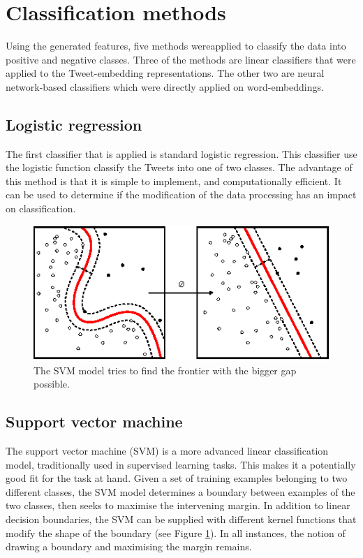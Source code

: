 \section{Classification methods}
\label{sec:methods}
Using the generated features, five methods wereapplied to classify the data into positive and negative classes. Three of the methods are linear classifiers that were applied to the Tweet-embedding representations. The other two are neural network-based classifiers which were directly applied on word-embeddings.

\subsection{Logistic regression}
The first classifier that is applied is standard logistic regression. This classifier use the logistic function classify the Tweets into one of two classes. The advantage of this method is that it is simple to implement, and computationally efficient. It can be used to determine if the modification of the data processing has an impact on classification.

\begin{figure}[h!]
\centering
	\includegraphics[scale=1.2]{SVM} 
\caption{The SVM model tries to find the frontier with the bigger gap possible. \cite{wikiSVM}}
\label{plot:SVM}
\end{figure}
\FloatBarrier

\subsection{Support vector machine}
The support vector machine (SVM) is a more advanced linear classification model, traditionally used in supervised learning tasks. This makes it a potentially good fit for the task at hand. Given a set of training examples belonging to two different classes, the SVM model determines a boundary between examples of the two classes, then seeks to maximise the intervening margin. In addition to linear decision boundaries, the SVM can be supplied with different kernel functions that modify the shape of the boundary (see Figure \ref{plot:SVM}). In all instances, the notion of drawing a boundary and maximising the margin remains.

